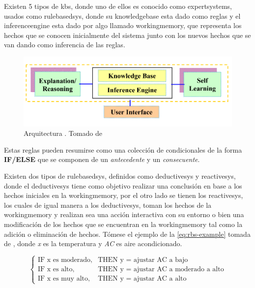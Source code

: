 Existen 5 tipos de \gls{kbs}, donde uno de ellos es conocido como \gls{expertsystems}, usados como \gls{rulebasedsys}, donde su \gls{knowledgebase} esta dado como reglas y el \gls{inferenceengine} esta dado por algo llamado \gls{workingmemory}, que representa los hechos que se conocen inicialmente del sistema junto con los nuevos hechos que se van dando como inferencia de las reglas.

\begin{figure}[H]
\centering
\includegraphics[scale=0.4]{Figures/kbs-architecture.png}
\decoRule
\caption[Arquitectura ]{Arquitectura . Tomado de \cite{sajja2010knowledge} }
\label{fig:kbs-arch}
\end{figure}

Estas reglas pueden resumirse como una colección de condicionales de la forma \textbf{IF/ELSE} que se componen de un \emph{antecedente} y un \emph{consecuente}.

Existen dos tipos de \gls{rulebasedsys}, definidos como \gls{deductivesys} y \gls{reactivesys}, donde el \gls{deductivesys} tiene como objetivo realizar una conclusión en base a los hechos iniciales en la \gls{workingmemory}, por el otro lado se tienen los \gls{reactivesys}, los cuales de igual manera a los \gls{deductivesys}, toman los hechos de la \gls{workingmemory} y realizan sea una acción interactiva con su entorno o bien una modificación de los hechos que se encuentran en la \gls{workingmemory} tal como la adición o eliminación de hechos. Tómese el ejemplo de la \cref{eq:rbs-example} tomada de \cite{Mendel}, donde \emph{x} es la temperatura y \emph{AC} es aire acondicionado.

\begin{equation} \label{eq:rbs-example}
  \left\{ \begin{array}{ll}
            \text{IF x es moderado,} & \text{THEN y = ajustar AC a bajo} \\
            \text{IF x es alto,}     & \text{THEN y = ajustar AC a moderado a alto} \\
            \text{IF x es muy alto,} & \text{THEN y = ajustar AC a alto} 
          \end{array} \right.
\end{equation}

